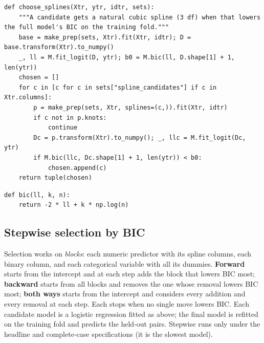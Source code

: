 \documentclass[11pt]{article}
\begin{document}
\begin{lstlisting}[caption={Choosing splines by BIC (scripts/part1\_models.py)}]
def choose_splines(Xtr, ytr, idtr, sets):
    """A candidate gets a natural cubic spline (3 df) when that lowers the full model's BIC on the training fold."""
    base = make_prep(sets, Xtr).fit(Xtr, idtr); D = base.transform(Xtr).to_numpy()
    _, ll = M.fit_logit(D, ytr); b0 = M.bic(ll, D.shape[1] + 1, len(ytr))
    chosen = []
    for c in [c for c in sets["spline_candidates"] if c in Xtr.columns]:
        p = make_prep(sets, Xtr, splines=(c,)).fit(Xtr, idtr)
        if c not in p.knots:
            continue
        Dc = p.transform(Xtr).to_numpy(); _, llc = M.fit_logit(Dc, ytr)
        if M.bic(llc, Dc.shape[1] + 1, len(ytr)) < b0:
            chosen.append(c)
    return tuple(chosen)
\end{lstlisting}

\begin{lstlisting}[caption={BIC (scripts/modeling.py)}]
def bic(ll, k, n):
    return -2 * ll + k * np.log(n)
\end{lstlisting}

\subsection{Stepwise selection by BIC}

Selection works on \emph{blocks}: each numeric predictor with its spline columns, each binary column, and each
categorical variable with all its dummies. \textbf{Forward} starts from the intercept and at each step adds the block
that lowers BIC most; \textbf{backward} starts from all blocks and removes the one whose removal lowers BIC most;
\textbf{both ways} starts from the intercept and considers every addition and every removal at each step. Each stops
when no single move lowers BIC. Each candidate model is a logistic regression fitted as above; the final model is
refitted on the training fold and predicts the held-out pairs. Stepwise runs only under the headline and complete-case
specifications (it is the slowest model).
\end{document}
